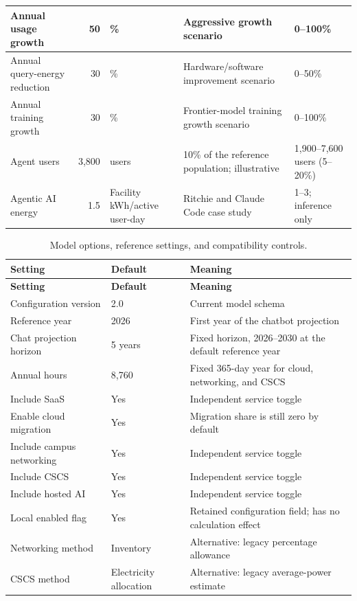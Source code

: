 {\begin{longtable}{|L{0.23\textwidth}|r|L{0.15\textwidth}|L{0.25\textwidth}|L{0.16\textwidth}|}
Annual usage growth & 50 & \% & Aggressive growth scenario & 0--100\% \\ \hline
Annual query-energy reduction & 30 & \% & Hardware/software improvement scenario & 0--50\% \\ \hline
Annual training growth & 30 & \% & Frontier-model training growth scenario & 0--100\% \\ \hline
Agent users & 3,800 & users & 10\% of the reference population; illustrative & 1,900--7,600 users (5--20\%) \\ \hline
Agentic AI energy & 1.5 & Facility kWh/active user-day & Ritchie and Claude Code case study & 1--3; inference only \\ \hline
\end{longtable}


\begin{longtable}{|L{0.30\textwidth}|L{0.15\textwidth}|L{0.46\textwidth}|}
\caption{Model options, reference settings, and compatibility controls.}\label{tab:param-options}\\
\hline
\textbf{Setting} & \textbf{Default} & \textbf{Meaning} \\ \hline
\endfirsthead
\hline
\textbf{Setting} & \textbf{Default} & \textbf{Meaning} \\ \hline
\endhead
Configuration version & 2.0 & Current model schema \\ \hline
Reference year & 2026 & First year of the chatbot projection \\ \hline
Chat projection horizon & 5 years & Fixed horizon, 2026--2030 at the default reference year \\ \hline
Annual hours & 8,760 & Fixed 365-day year for cloud, networking, and CSCS \\ \hline
Include SaaS & Yes & Independent service toggle \\ \hline
Enable cloud migration & Yes & Migration share is still zero by default \\ \hline
Include campus networking & Yes & Independent service toggle \\ \hline
Include CSCS & Yes & Independent service toggle \\ \hline
Include hosted AI & Yes & Independent service toggle \\ \hline
Local enabled flag & Yes & Retained configuration field; has no calculation effect \\ \hline
Networking method & Inventory & Alternative: legacy percentage allowance \\ \hline
CSCS method & Electricity allocation & Alternative: legacy average-power estimate \\ \hline

\end{longtable}}

